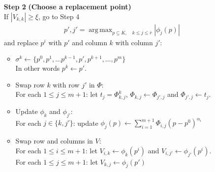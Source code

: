 \documentclass{article}
\theoremstyle{case}
\DeclareMathOperator*{\argmax}{arg\,max}
\begin{document}
\begin{algorithm}[H]
\begin{itemize}
        \item[\textbf{Step 2}] \textbf{(Choose a replacement point)} \\
        	If $|V_{k,k}| \ge \xi$, go to Step 4 \\
\begin{align*}
p', j' = \argmax_{p \subseteq K, \quad k \le j \le \bar{r}} |\phi_j(p) |
\end{align*}
			and replace $p^i$ with $p'$ and column $k$ with column $j'$:
			\begin{itemize}
				\item $\sigma^{k} \gets \{p^0, p^1, \ldots p^{k-1}, p', p^{k+1}, \ldots, p^m\}$ \\
					In other words $p^k \gets p'$.
				\item Swap row $k$ with row $j'$ in $\Phi$: \\
					For each $1 \le j \le m+1$: let $t_j = \Phi^k_{k, j}$, $\Phi_{k, j} \gets \Phi_{j', j}$ and $\Phi_{j', j} \gets t_j$.
				\item Update $\phi_k$ and $\phi_{j'}$: \\
					For each $j \in \{k, j'\}$: update $\phi_j(p) \gets \sum_{i=1}^{m+1} \Phi_{i, j} (p - p^0)^{\alpha_i}$
				\item Swap row and columns in $V$:\\
					For each $1 \le i \le m+1$: let $V_{i, k} \gets \phi_k(p^i)$ and $V_{i, j'} \gets \phi_{j'}(p^i)$.\\ 
					For each $1 \le j \le m+1$: let $V_{k, j} \gets \phi_j(p')$
			\end{itemize}
        	

\end{itemize}
\end{algorithm}
\end{document}
